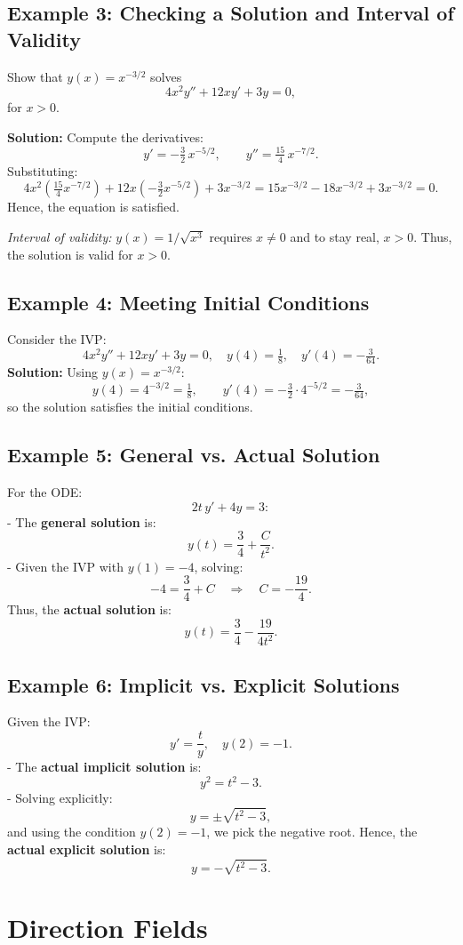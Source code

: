 \documentclass[12pt]{book}
\begin{document}
\subsection*{Example 3: Checking a Solution and Interval of Validity}
Show that \( y(x) = x^{-3/2} \) solves
\[
4x^2y'' + 12xy' + 3y = 0,
\]
for \(x > 0\).

\textbf{Solution:}  
Compute the derivatives:
\[
y' = -\tfrac{3}{2}\,x^{-5/2}, 
\qquad
y'' = \tfrac{15}{4}\,x^{-7/2}.
\]
Substituting:
\[
4x^2\left(\tfrac{15}{4}x^{-7/2}\right)
+ 12x\left(-\tfrac{3}{2}x^{-5/2}\right)
+ 3x^{-3/2}
= 15x^{-3/2} - 18x^{-3/2} + 3x^{-3/2} = 0.
\]
Hence, the equation is satisfied. 

\emph{Interval of validity:} \(y(x) = 1/\sqrt{x^3}\) requires \(x \neq 0\) and to stay real, \(x > 0\). Thus, the solution is valid for \(x > 0\).

\subsection*{Example 4: Meeting Initial Conditions}
Consider the IVP:
\[
4x^2y'' + 12xy' + 3y = 0, \quad y(4) = \tfrac{1}{8}, \quad y'(4) = -\tfrac{3}{64}.
\]
\textbf{Solution:}  
Using \( y(x) = x^{-3/2} \):
\[
y(4) = 4^{-3/2} = \tfrac{1}{8}, 
\qquad
y'(4) = -\tfrac{3}{2} \cdot 4^{-5/2} = -\tfrac{3}{64},
\]
so the solution satisfies the initial conditions.

\subsection*{Example 5: General vs. Actual Solution}
For the ODE:
\[
2t\,y' + 4y = 3:
\]
- The \textbf{general solution} is:
\[
y(t) = \frac{3}{4} + \frac{C}{t^2}.
\]
- Given the IVP with \(y(1) = -4\), solving:
\[
-4 = \frac{3}{4} + C \quad\Rightarrow\quad C = -\frac{19}{4}.
\]
Thus, the \textbf{actual solution} is:
\[
y(t) = \frac{3}{4} - \frac{19}{4t^2}.
\]

\subsection*{Example 6: Implicit vs. Explicit Solutions}
Given the IVP:
\[
y' = \frac{t}{y}, \quad y(2) = -1.
\]
- The \textbf{actual implicit solution} is:
\[
y^2 = t^2 - 3.
\]
- Solving explicitly:
\[
y = \pm\sqrt{t^2 - 3},
\]
and using the condition \(y(2) = -1\), we pick the negative root. Hence, the \textbf{actual explicit solution} is:
\[
y = -\sqrt{t^2 - 3}.
\]

\section{Direction Fields}
\end{document}
